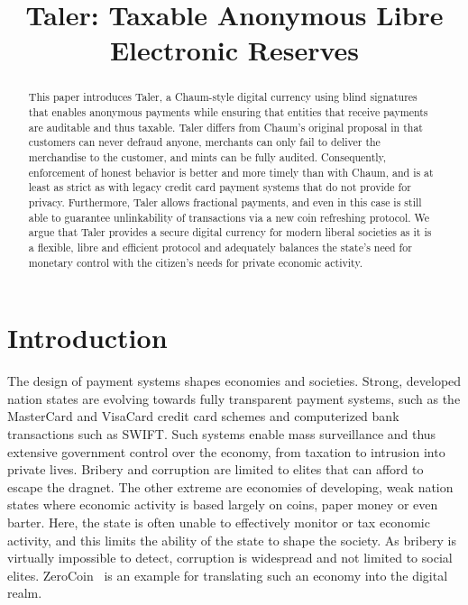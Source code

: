 \documentclass{llncs}
\title{Taler: Taxable Anonymous Libre Electronic Reserves}
\begin{document}
\mainmatter



\maketitle

\begin{abstract}
This paper introduces Taler, a Chaum-style digital currency using
blind signatures that enables anonymous payments while ensuring that
entities that receive payments are auditable and thus taxable.  Taler
differs from Chaum's original proposal in that customers can never
defraud anyone, merchants can only fail to deliver the merchandise to
the customer, and mints can be fully audited. Consequently,
enforcement of honest behavior is better and more timely than with
Chaum, and is at least as strict as with legacy credit card payment
systems that do not provide for privacy.  Furthermore, Taler allows
fractional payments, and even in this case is still able to guarantee
unlinkability of transactions via a new coin refreshing protocol.  We
argue that Taler provides a secure digital currency for modern liberal
societies as it is a flexible, libre and efficient protocol and
adequately balances the state's need for monetary control with the
citizen's needs for private economic activity.
\end{abstract}

\section{Introduction}

The design of payment systems shapes economies and societies.  Strong,
developed nation states are evolving towards fully transparent payment
systems, such as the MasterCard and VisaCard credit card schemes and
computerized bank transactions such as SWIFT.  Such systems enable
mass surveillance and thus extensive government control over the
economy, from taxation to intrusion into private lives.  Bribery and
corruption are limited to elites that can afford to escape the
dragnet.  The other extreme are economies of developing, weak nation
states where economic activity is based largely on coins, paper money
or even barter.  Here, the state is often unable to effectively
monitor or tax economic activity, and this limits the ability of the
state to shape the society.  As bribery is virtually impossible to
detect, corruption is widespread and not limited to social elites.
ZeroCoin~\cite{miers2013zerocoin} is an example for translating such
an economy into the digital realm.
\end{document}
